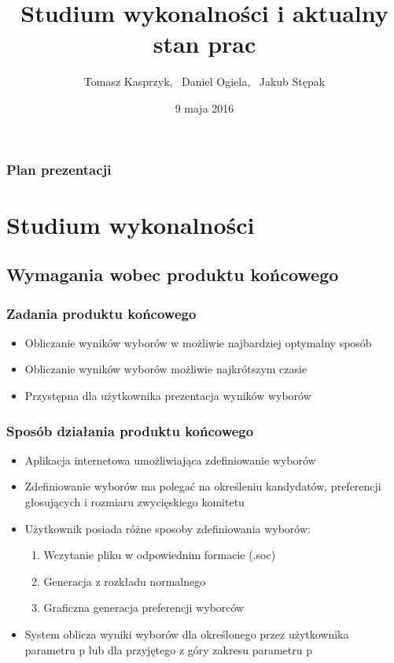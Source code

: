 \documentclass{beamer}
\title
[System obliczający wyniki wyborów]
{Studium wykonalności i aktualny stan prac}
\author
[T. Kasprzyk, D. Ogiela, J. Stępak]
{Tomasz Kasprzyk, \ Daniel Ogiela, \ Jakub Stępak}
\institute
[AGH]
{
Akademia Górniczo-Hutnicza

Wydział Informatyki, Elektroniki i Telekomunikacji

Katedra Informatyki 

}
\date{9 maja 2016}
\begin{document}
\frame{\titlepage}

\begin{frame}
\frametitle{Plan prezentacji}
\tableofcontents
\end{frame}


\section{Studium wykonalności}
\subsection{Wymagania wobec produktu końcowego}

\begin{frame}

\frametitle{Zadania produktu końcowego}
\begin{itemize}
\item Obliczanie wyników wyborów w możliwie najbardziej optymalny sposób
\item Obliczanie wyników wyborów możliwie najkrótszym czasie
\item Przystępna dla użytkownika prezentacja wyników wyborów
\end{itemize}

\end{frame}

\begin{frame}

\frametitle{Sposób działania produktu końcowego}
\begin{itemize}
\item Aplikacja internetowa umożliwiająca zdefiniowanie wyborów
\item Zdefiniowanie wyborów ma polegać na określeniu kandydatów, preferencji głosujących i rozmiaru zwycięskiego komitetu
\item Użytkownik posiada różne sposoby zdefiniowania wyborów:
\begin{enumerate}
\item Wczytanie pliku w odpowiednim formacie (.soc)
\item Generacja z rozkładu normalnego
\item Graficzna generacja preferencji wyborców
\end{enumerate}
\item System oblicza wyniki wyborów dla określonego przez użytkownika parametru  p  lub dla przyjętego z góry zakresu parametru  p
\end{itemize}

\end{frame}
\end{document}
